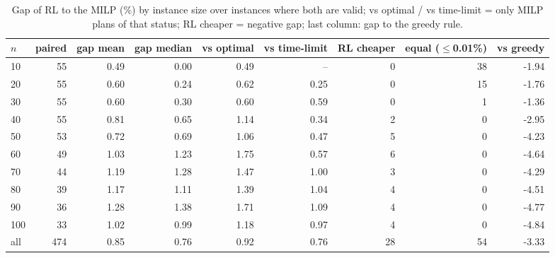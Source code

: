 \begin{table}[H]\centering
\small
\caption{Gap of RL to the MILP (\%) by instance size over instances where both are valid; vs optimal / vs time-limit = only MILP plans of that status; RL cheaper = negative gap; last column: gap to the greedy rule.}\label{tab:qualityn}
\begin{adjustbox}{max width=\textwidth}\begin{tabular}{lrrrrrrrr}\toprule
$n$ & paired & gap mean & gap median & vs optimal & vs time-limit & RL cheaper & equal ($\le$0.01\%) & vs greedy \\ \midrule
10 & 55 & 0.49 & 0.00 & 0.49 & -- & 0 & 38 & -1.94 \\
20 & 55 & 0.60 & 0.24 & 0.62 & 0.25 & 0 & 15 & -1.76 \\
30 & 55 & 0.60 & 0.30 & 0.60 & 0.59 & 0 & 1 & -1.36 \\
40 & 55 & 0.81 & 0.65 & 1.14 & 0.34 & 2 & 0 & -2.95 \\
50 & 53 & 0.72 & 0.69 & 1.06 & 0.47 & 5 & 0 & -4.23 \\
60 & 49 & 1.03 & 1.23 & 1.75 & 0.57 & 6 & 0 & -4.64 \\
70 & 44 & 1.19 & 1.28 & 1.47 & 1.00 & 3 & 0 & -4.29 \\
80 & 39 & 1.17 & 1.11 & 1.39 & 1.04 & 4 & 0 & -4.51 \\
90 & 36 & 1.28 & 1.38 & 1.71 & 1.09 & 4 & 0 & -4.77 \\
100 & 33 & 1.02 & 0.99 & 1.18 & 0.97 & 4 & 0 & -4.84 \\
\midrule all & 474 & 0.85 & 0.76 & 0.92 & 0.76 & 28 & 54 & -3.33 \\
\bottomrule\end{tabular}\end{adjustbox}\end{table}
